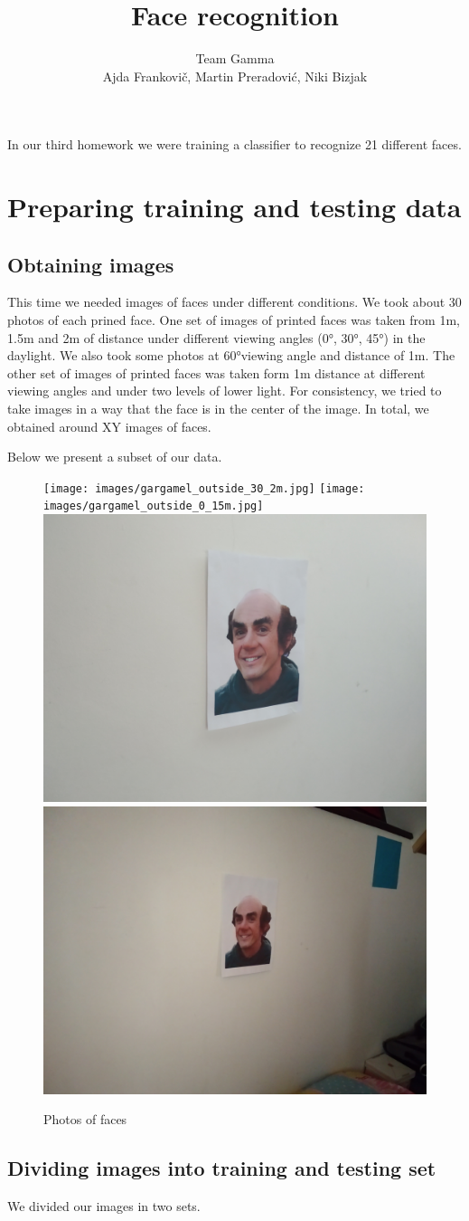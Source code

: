 \documentclass[12pt,a4paper]{article}
\author{Team Gamma \\ {\small Ajda Frankovič, Martin Preradović, Niki Bizjak}}
\title{Face recognition}
\date{}
\begin{document}
    \maketitle

    In our third homework we were training a classifier to recognize 21 different faces.

    \section{Preparing training and testing data}

    \subsection{Obtaining images}

    This time we needed images of faces under different conditions. We took about 30 photos of each prined face. %
    One set of images of printed faces was taken from 1m, 1.5m and 2m of distance under different viewing angles (0°, 30°, 45°) in the daylight. We also took some photos at 60°viewing angle and distance of 1m.
    The other set of images of printed faces was taken form 1m distance at different viewing angles and under two levels of lower light.
    For consistency, we tried to take images in a way that the face is in the center of the image.
    In total, we obtained around XY images of faces. %

    Below we present a subset of our data.

    \begin{figure}[H]
        \centering
        \texttt{[image: images/gargamel\_outside\_30\_2m.jpg]}
        \texttt{[image: images/gargamel\_outside\_0\_15m.jpg]}
        \includegraphics[width=.20\linewidth]{images/gargamel_inside_30_light.jpg}
        \includegraphics[width=.20\linewidth]{images/gargamel_inside_30_dark.jpg}
        \caption{Photos of faces}
    \end{figure}

    \subsection{Dividing images into training and testing set}

    We divided our images in two sets.
\end{document}
